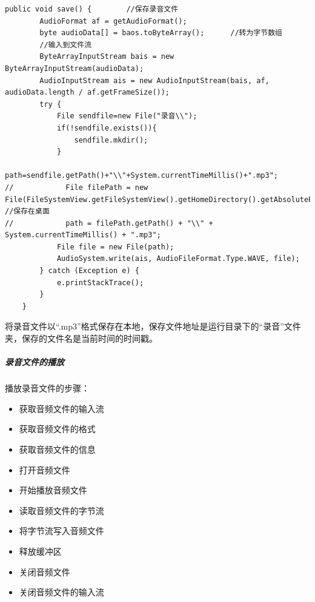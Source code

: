 \documentclass[UTF8,12pt]{article}
\begin{document}
\begin{lstlisting}[title=录音文件的保存,frame=shadowbox]
    public void save() {        //保存录音文件
        AudioFormat af = getAudioFormat();
        byte audioData[] = baos.toByteArray();      //转为字节数组
        //输入到文件流
        ByteArrayInputStream bais = new ByteArrayInputStream(audioData);
        AudioInputStream ais = new AudioInputStream(bais, af, audioData.length / af.getFrameSize());
        try {
            File sendfile=new File("录音\\");
            if(!sendfile.exists()){
                sendfile.mkdir();
            }
            path=sendfile.getPath()+"\\"+System.currentTimeMillis()+".mp3";
//            File filePath = new File(FileSystemView.getFileSystemView().getHomeDirectory().getAbsolutePath());   //保存在桌面
//            path = filePath.getPath() + "\\" + System.currentTimeMillis() + ".mp3";
            File file = new File(path);
            AudioSystem.write(ais, AudioFileFormat.Type.WAVE, file);
        } catch (Exception e) {
            e.printStackTrace();
        }
    }
\end{lstlisting}

将录音文件以“.mp3”格式保存在本地，保存文件地址是运行目录下的“录音”文件夹，保存的文件名是当前时间的时间戳。

\subparagraph{录音文件的播放}
播放录音文件的步骤：
\begin{itemize}
    \item 获取音频文件的输入流
    \item 获取音频文件的格式
    \item 获取音频文件的信息
    \item 打开音频文件
    \item 开始播放音频文件
    \item 读取音频文件的字节流
    \item 将字节流写入音频文件
    \item 释放缓冲区
    \item 关闭音频文件
    \item 关闭音频文件的输入流
\end{itemize}
\end{document}
